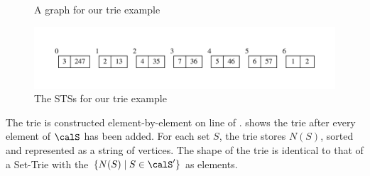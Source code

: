 \begin{figure}[htb]
  \centering
  \caption{A graph for our trie example}
  \label{fig:TrieExampleGraph}
\end{figure}

\begin{figure}[htb]
  \centering
  \includegraphics[scale=.6]{70-bute/img/leafysets}
  \caption{The STSs for our trie example}
  \label{fig:TrieSTSs}
\end{figure}

The trie is constructed element-by-element on line 
of .   shows the trie after every element
of $\calS$ has been added.  For each set $S$, the trie stores $N(S)$,
sorted and represented as a string of vertices.
The shape of the trie is identical to that of a
Set-Trie \cite{DBLP:conf/IEEEares/Savnik13} with the $\{N(S) \mid S \in \calS'\}$
as elements.

